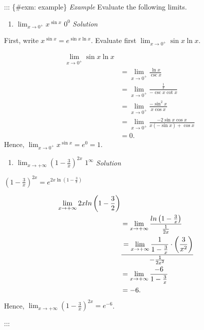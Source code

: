 \documentclass[
  letterpaper,
  DIV=11,
  numbers=noendperiod]{scrartcl}
\providecommand{\tightlist}{%
  \setlength{\itemsep}{0pt}\setlength{\parskip}{0pt}}\usepackage{longtable,booktabs,array}
\theoremstyle{plain}
\theoremstyle{remark}
\begin{document}
::: \{\#exm: example\} \emph{Example} Evaluate the following limits.

\begin{enumerate}
\def\labelenumi{\arabic{enumi}.}
\tightlist
\item
  \(\displaystyle\lim_{x\to 0^+}{x^{\sin x}}\) \(0^0\) \emph{Solution}
\end{enumerate}

First, write \(x^{\sin x}=e^{\sin x \ln x}\). Evaluate first
\(\displaystyle\lim_{x\to 0^+}{\sin x \ln x}\).

\[
\begin{aligned}
\displaystyle\lim_{x\to 0^+}{\sin x \ln x}\\&=\displaystyle\lim_{x\to 0^+}{\frac{\ln x}{\csc x}}\\&=\displaystyle\lim_{x\to 0^+}{\frac{\frac{1}{x}}{-\csc x \cot x}}\\&=\displaystyle\lim_{x\to 0^+}{\frac{-\sin^2 x}{x \cos x}}\\&=\displaystyle\lim_{x\to 0^+}{\frac{-2\sin x \cos x}{x(-\sin x)+\cos x}}\\&=0.
\end{aligned}
\] Hence, \(\displaystyle\lim_{x\to 0^+}{x^{\sin x}}=e^0=1\).

\begin{enumerate}
\def\labelenumi{\arabic{enumi}.}
\setcounter{enumi}{1}
\tightlist
\item
  \(\displaystyle\lim_{x\to +\infty}{\left(1-\frac{3}{x}\right)^{2x}}\)
  \(1^\infty\) \emph{Solution}
\end{enumerate}

\(\left(1-\frac{3}{x}\right)^{2x}=e^{2x\ln \left(1-\frac{3}{x}\right)}\)

\[
\begin{aligned}
\displaystyle\lim_{x\to +\infty}{2x ln \left(1-\frac{3}{2}\right)}\\&=\displaystyle\lim_{x\to +\infty}{\frac{ln \left(1-\frac{3}{x}\right)}{\frac{1}{2x}}}\\&=\displaystyle\lim_{x\to +\infty}{\frac{1}{1-\frac{3}{x}}}\cdot \left(\frac{3}{x^2}\right)\over-\frac{1}{2x^2}\\&=\displaystyle\lim_{x\to +\infty}{\frac{-6}{1-\frac{3}{x}}}\\&=-6.
\end{aligned}
\] Hence,
\(\displaystyle\lim_{x\to +\infty}{\left(1-\frac{3}{x}\right)^{2x}}=e^{-6}\).

:::
\end{document}
